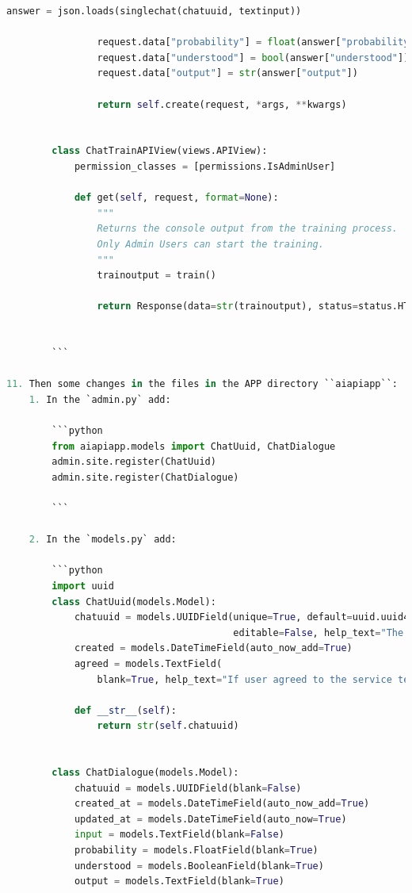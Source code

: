 \documentclass[12pt,oneside,titlepage,listof=totoc,bibliography=totoc]{scrartcl}
\begin{document}
\begin{appendices}
\begin{lstlisting}[language=python,numbers=none]
                answer = json.loads(singlechat(chatuuid, textinput))

                request.data["probability"] = float(answer["probability"])
                request.data["understood"] = bool(answer["understood"])
                request.data["output"] = str(answer["output"])

                return self.create(request, *args, **kwargs)


        class ChatTrainAPIView(views.APIView):
            permission_classes = [permissions.IsAdminUser]

            def get(self, request, format=None):
                """
                Returns the console output from the training process.
                Only Admin Users can start the training.
                """
                trainoutput = train()
                
                return Response(data=str(trainoutput), status=status.HTTP_200_OK)


        ```

11. Then some changes in the files in the APP directory ``aiapiapp``:
    1. In the `admin.py` add:

        ```python
        from aiapiapp.models import ChatUuid, ChatDialogue
        admin.site.register(ChatUuid)
        admin.site.register(ChatDialogue)

        ```

    2. In the `models.py` add:

        ```python
        import uuid
        class ChatUuid(models.Model):
            chatuuid = models.UUIDField(unique=True, default=uuid.uuid4,
                                        editable=False, help_text="The UUID for a Chatbot conversation.")
            created = models.DateTimeField(auto_now_add=True)
            agreed = models.TextField(
                blank=True, help_text="If user agreed to the service terms (http://...), send 'Einverstanden'.")

            def __str__(self):
                return str(self.chatuuid)


        class ChatDialogue(models.Model):
            chatuuid = models.UUIDField(blank=False)
            created_at = models.DateTimeField(auto_now_add=True)
            updated_at = models.DateTimeField(auto_now=True)
            input = models.TextField(blank=False)
            probability = models.FloatField(blank=True)
            understood = models.BooleanField(blank=True)
            output = models.TextField(blank=True)


\end{lstlisting}
\end{appendices}
\end{document}
